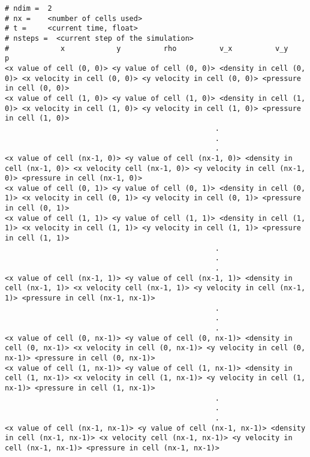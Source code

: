 \begin{lstlisting}
# ndim =  2
# nx =    <number of cells used>
# t =     <current time, float>
# nsteps =  <current step of the simulation>
#            x            y          rho          v_x          v_y            p
<x value of cell (0, 0)> <y value of cell (0, 0)> <density in cell (0, 0)> <x velocity in cell (0, 0)> <y velocity in cell (0, 0)> <pressure in cell (0, 0)>
<x value of cell (1, 0)> <y value of cell (1, 0)> <density in cell (1, 0)> <x velocity in cell (1, 0)> <y velocity in cell (1, 0)> <pressure in cell (1, 0)>
                                                 .
                                                 .
                                                 .
<x value of cell (nx-1, 0)> <y value of cell (nx-1, 0)> <density in cell (nx-1, 0)> <x velocity cell (nx-1, 0)> <y velocity in cell (nx-1, 0)> <pressure in cell (nx-1, 0)>
<x value of cell (0, 1)> <y value of cell (0, 1)> <density in cell (0, 1)> <x velocity in cell (0, 1)> <y velocity in cell (0, 1)> <pressure in cell (0, 1)>
<x value of cell (1, 1)> <y value of cell (1, 1)> <density in cell (1, 1)> <x velocity in cell (1, 1)> <y velocity in cell (1, 1)> <pressure in cell (1, 1)>
                                                 .
                                                 .
                                                 .
<x value of cell (nx-1, 1)> <y value of cell (nx-1, 1)> <density in cell (nx-1, 1)> <x velocity cell (nx-1, 1)> <y velocity in cell (nx-1, 1)> <pressure in cell (nx-1, nx-1)>
                                                 .
                                                 .
                                                 .
<x value of cell (0, nx-1)> <y value of cell (0, nx-1)> <density in cell (0, nx-1)> <x velocity in cell (0, nx-1)> <y velocity in cell (0, nx-1)> <pressure in cell (0, nx-1)>
<x value of cell (1, nx-1)> <y value of cell (1, nx-1)> <density in cell (1, nx-1)> <x velocity in cell (1, nx-1)> <y velocity in cell (1, nx-1)> <pressure in cell (1, nx-1)>
                                                 .
                                                 .
                                                 .
<x value of cell (nx-1, nx-1)> <y value of cell (nx-1, nx-1)> <density in cell (nx-1, nx-1)> <x velocity cell (nx-1, nx-1)> <y velocity in cell (nx-1, nx-1)> <pressure in cell (nx-1, nx-1)>
\end{lstlisting}


